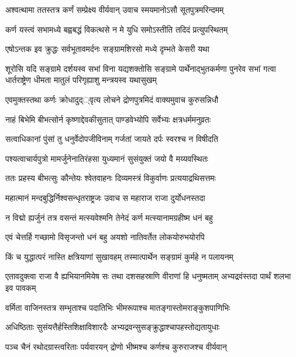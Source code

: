 \twolineshloka
{अश्वत्थामा ततस्तत्र कर्णं सम्प्रेक्ष्य वीर्यवान्}
{उवाच स्मयमानोऽसौ सूतपुत्रमरिन्दमम्}


\twolineshloka
{कर्ण यस्त्वं सभामध्ये बह्वबद्धं विकत्थसे}
{न मे युधि समोऽस्तीति तदिदं प्रत्युपस्थितम्}


\twolineshloka
{एषोऽन्तक इव क्रुद्धः सर्वभूतावमर्दनः}
{सङ्ग्रामशिरसो मध्ये दृम्भते केसरी यथा}


\onelineshloka
{शूरोसि यदि सङ्ग्रामे दर्शयस्व सभां विना}
\threelineshloka
{यद्यशक्तोसि सङ्ग्रामे पार्थेनाद्भुतकर्मणा}
{पुनरेव सभां गत्वा धार्तराष्ट्रेण धीमता}
{मातुलं परिगृह्याशु मन्त्रयस्व यथासुखम्}



\twolineshloka
{एवमुक्तस्तथा कर्णः क्रोधादुद््वृत्य लोचने}
{द्रोणपुत्रमिदं वाक्यमुवाच कुरुसन्निधौ}


\twolineshloka
{नाहं बिभेमि बीभत्सोर्न कृष्णाद्देवकीसुतात्}
{पाण्डवेभ्योपि सर्वेभ्यः क्षत्रधर्ममनुव्रतः}


\twolineshloka
{सत्वाधिकानां पुंसां तु धनुर्वेदोपजीविनाम्}
{गर्जतां जायते दर्पः स्वरश्च न विषीदति}


\twolineshloka
{पश्यत्वाचार्यपुत्रो मामर्जुनेनातिरंहसा}
{युध्यमानं सुसंयुक्तं जयो वै मय्यवस्थितः}



\twolineshloka
{ततः प्रहस्य बीभत्सुः कौन्तेयः श्वेतवाहनः}
{दिव्यमस्त्रं विकुर्वाणः प्रत्ययाद्रथिसत्तमः}


\twolineshloka
{महात्मानं मन्दबुद्धिर्निश्वसन्धृतराष्ट्रजः}
{उवाच स महाराज राजा दुर्योधनस्तदा}


\twolineshloka
{न विद्मो ह्यर्जुनं तत्र वसन्तं मत्स्यवेश्मनि}
{तेनेदं कर्ण मत्स्यानामग्रहीष्म धनं बहु}


\twolineshloka
{एवं चेत्तर्हि गच्छामो विसृजन्तो धनं बहु}
{अयशो नातिवर्तेत लोकयोरुभयोरपि}


\twolineshloka
{किं च युद्धात्परं नास्ति क्षत्रियाणां सुखावहम्}
{तस्मात्पार्थेन सङ्ग्रामं कुर्महे न पलायनम्}


\threelineshloka
{एतावदुक्त्वा राजा वै ह्यभियानमियेष सः}
{तथा दशसहस्राणि वीराणां हि धनुष्मताम्}
{अभ्यद्रवंस्तदा पार्थं शलभा इव पावकम्}


\twolineshloka
{वर्मिता वाजिनस्तत्र सम्भृताश्च पदातिभिः}
{भीमरूपाश्च मातङ्गास्तोमराङ्कुशपाणिभिः}



\twolineshloka
{अधिष्ठिताः सुसंयत्तैर्हस्तिशिक्षाविशारदैः}
{अभ्यद्रवन्सुसङ्क्रुद्धाश्चापहस्तोद्यतायुधाः}


\twolineshloka
{पञ्च चैनं रथोदग्रास्त्वरिताः पर्यवारयन्}
{द्रोणो भीष्मश्च कर्णश्च कुरुराजश्च वीर्यवान्}


